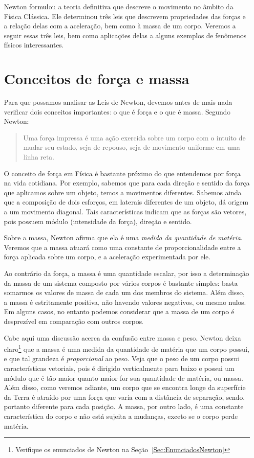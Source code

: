 Newton formulou a teoria definitiva que descreve o movimento no âmbito da Física Clássica. Ele determinou três leis que descrevem propriedades das forças e a relação delas com a aceleração, bem como à massa de um corpo. Veremos a seguir essas três leis, bem como aplicações delas a alguns exemplos de fenômenos físicos interessantes.

\section{Conceitos de força e massa}

Para que possamos analisar as Leis de Newton, devemos antes de mais nada verificar dois conceitos importantes: o que é força e o que é massa. Segundo Newton:

\begin{quote}
    Uma força impressa é uma ação exercida sobre um corpo com o intuito de mudar seu estado, seja de repouso, seja de movimento uniforme em uma linha reta.
\end{quote}

\noindent{}O conceito de força em Física é bastante próximo do que entendemos por força na vida cotidiana. Por exemplo, sabemos que para cada direção e sentido da força que aplicamos sobre um objeto, temos a movimentos diferentes. Sabemos ainda que a composição de dois esforços, em laterais diferentes de um objeto, dá origem a um movimento diagonal. Tais características indicam que as forças são vetores, pois possuem módulo (intensidade da força), direção e sentido.

Sobre a massa, Newton afirma que ela é uma \emph{medida da quantidade de matéria}. Veremos que a massa atuará como uma constante de proporcionalidade entre a força aplicada sobre um corpo, e a aceleração experimentada por ele.

Ao contrário da força, a massa é uma quantidade escalar, por isso a determinação da massa de um sistema composto por vários corpos é bastante simples: basta somarmos os valores de massa de cada um dos membros do sistema. Além disso, a massa é estritamente positiva, não havendo valores negativos, ou mesmo nulos. Em alguns casos, no entanto podemos considerar que a massa de um corpo é desprezível em comparação com outros corpos.

Cabe aqui uma discussão acerca da confusão entre massa e peso. Newton deixa claro\footnote{Verifique os enunciados de Newton na Seção~\ref{Sec:EnunciadosNewton}} que a massa é uma medida da quantidade de matéria que um corpo possui, e que tal grandeza é \emph{proporcional} ao peso. Veja que o peso de um corpo possui características vetoriais, pois é dirigido verticalmente para baixo e possui um módulo que é tão maior quanto maior for sua quantidade de matéria, ou massa. Além disso, como veremos adiante, um corpo que se encontra longe da superfície da Terra é atraído por uma força que varia com a distância de separação, sendo, portanto diferente para cada posição. A massa, por outro lado, é uma constante característica do corpo e não está sujeita a mudanças, exceto se o corpo perde matéria.

